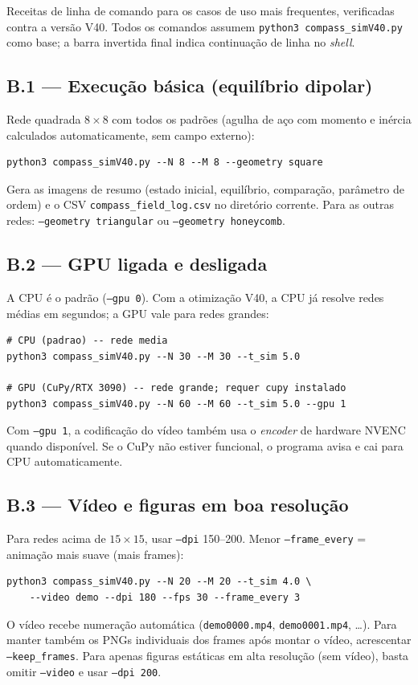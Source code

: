 \documentclass[11pt,a4paper]{article}
\newcommand{\code}[1]{\texttt{#1}}
\begin{document}
Receitas de linha de comando para os casos de uso mais frequentes,
verificadas contra a versão V40. Todos os comandos assumem
\code{python3 compass\_simV40.py} como base; a barra invertida final
indica continuação de linha no \emph{shell}.

\subsection*{B.1 --- Execução básica (equilíbrio dipolar)}

Rede quadrada $8\times8$ com todos os padrões (agulha de aço com
momento e inércia calculados automaticamente, sem campo externo):
\begin{verbatim}
python3 compass_simV40.py --N 8 --M 8 --geometry square
\end{verbatim}
Gera as imagens de resumo (estado inicial, equilíbrio, comparação,
parâmetro de ordem) e o CSV \code{compass\_field\_log.csv} no diretório
corrente. Para as outras redes: \code{--geometry triangular} ou
\code{--geometry honeycomb}.

\subsection*{B.2 --- GPU ligada e desligada}

A CPU é o padrão (\code{--gpu 0}). Com a otimização V40, a CPU já
resolve redes médias em segundos; a GPU vale para redes grandes:
\begin{verbatim}
# CPU (padrao) -- rede media
python3 compass_simV40.py --N 30 --M 30 --t_sim 5.0

# GPU (CuPy/RTX 3090) -- rede grande; requer cupy instalado
python3 compass_simV40.py --N 60 --M 60 --t_sim 5.0 --gpu 1
\end{verbatim}
Com \code{--gpu 1}, a codificação do vídeo também usa o
\emph{encoder} de hardware NVENC quando disponível. Se o CuPy não
estiver funcional, o programa avisa e cai para CPU automaticamente.

\subsection*{B.3 --- Vídeo e figuras em boa resolução}

Para redes acima de $15\times15$, usar \code{--dpi} 150--200. Menor
\code{--frame\_every} = animação mais suave (mais frames):
\begin{verbatim}
python3 compass_simV40.py --N 20 --M 20 --t_sim 4.0 \
    --video demo --dpi 180 --fps 30 --frame_every 3
\end{verbatim}
O vídeo recebe numeração automática (\code{demo0000.mp4},
\code{demo0001.mp4}, \dots). Para manter também os PNGs individuais dos
frames após montar o vídeo, acrescentar \code{--keep\_frames}. Para
apenas figuras estáticas em alta resolução (sem vídeo), basta omitir
\code{--video} e usar \code{--dpi 200}.
\end{document}
